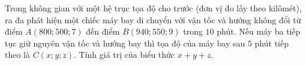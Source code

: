 \begin{bt}%
	Trong không gian với một hệ trục tọa độ cho trước (đơn vị đo lấy theo kilômét), ra đa phát hiện một chiếc máy bay di chuyển với vận tốc và hướng không đổi từ điểm $A(800;500;7)$ đến điểm $B(940;550;9)$ trong $10$ phút. Nếu máy ba tiếp tục giữ nguyên vận tốc và hướng bay thì tọa độ của máy bay sau $5$ phút tiếp theo là $C(x;y;z)$. Tính giá trị của biểu thức $x+y+z$.
\end{bt}

